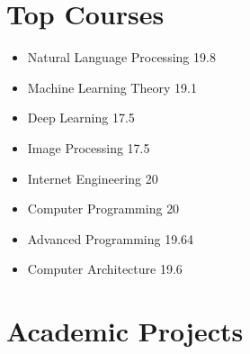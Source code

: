 \documentclass[11pt,a4paper,roman]{moderncv} %
\begin{document}
\section{Top Courses}

\begin{multicols}{2} 
	\begin{itemize}
		\item Natural Language Processing \hfill{19.8}
		\item Machine Learning Theory \hfill{19.1}
		\item Deep Learning \hfill{17.5}
		\item Image Processing \hfill{17.5}
		\item Internet Engineering						\hfill{20}
		\item Computer Programming               		\hfill{20}  
		\item Advanced Programming                    \hfill{19.64}
		\item Computer Architecture                    \hfill{19.6}
	\end{itemize}
\end{multicols}

\section{Academic Projects}
\end{document}
